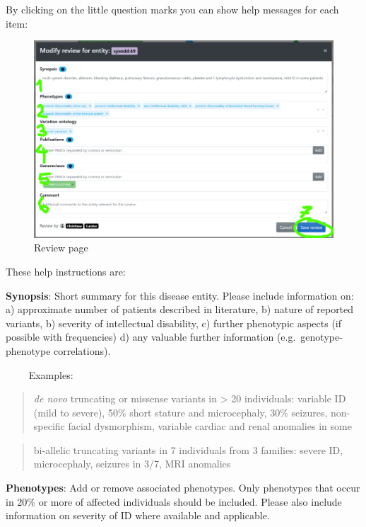 \documentclass[
]{article}
\begin{document}
By clicking on the little question marks you can show help messages for each item:

\begin{figure}
\centering
\includegraphics{./static/img/modal_modify_review.png}
\caption{Review page}
\end{figure}

These help instructions are:

\textbf{Synopsis}: Short summary for this disease entity. Please include information on: a) approximate number of patients described in literature, b) nature of reported variants, b) severity of intellectual disability, c) further phenotypic aspects (if possible with frequencies) d) any valuable further information (e.g.~genotype-phenotype correlations).

~~~~ Examples:

\begin{quote}
\emph{de novo} truncating or missense variants in \textgreater{} 20 individuals: variable ID (mild to severe), 50\% short stature and microcephaly, 30\% seizures, non-specific facial dysmorphism, variable cardiac and renal anomalies in some
\end{quote}

\begin{quote}
bi-allelic truncating variants in 7 individuals from 3 families: severe ID, microcephaly, seizures in 3/7, MRI anomalies
\end{quote}

\textbf{Phenotypes}: Add or remove associated phenotypes. Only phenotypes that occur in 20\% or more of affected individuals should be included. Please also include information on severity of ID where available and applicable.
\end{document}
